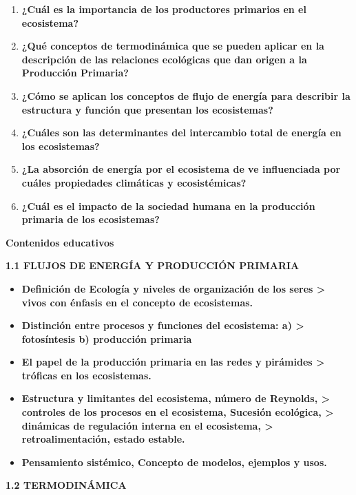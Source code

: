 \documentclass[
]{article}
\begin{document}
\begin{enumerate}
\def\labelenumi{\arabic{enumi}.}
\item
  \textbf{¿Cuál es la importancia de los productores primarios en el
  ecosistema?}
\item
  \textbf{¿Qué conceptos de termodinámica que se pueden aplicar en la
  descripción de las relaciones ecológicas que dan origen a la
  Producción Primaria?}
\item
  \textbf{¿Cómo se aplican los conceptos de flujo de energía para
  describir la estructura y función que presentan los ecosistemas?}
\item
  \textbf{¿Cuáles son las determinantes del intercambio total de energía
  en los ecosistemas?}
\item
  \textbf{¿La absorción de energía por el ecosistema de ve influenciada
  por cuáles propiedades climáticas y ecosistémicas?}
\item
  \textbf{¿Cuál es el impacto de la sociedad humana en la producción
  primaria de los ecosistemas?}
\end{enumerate}

\textbf{Contenidos educativos}

\textbf{1.1 FLUJOS DE ENERGÍA Y PRODUCCIÓN PRIMARIA}

\begin{itemize}
\item
  \textbf{Definición de Ecología y niveles de organización de los seres
  \textgreater{} vivos con énfasis en el concepto de ecosistemas.}
\item
  \textbf{Distinción entre procesos y funciones del ecosistema: a)
  \textgreater{} fotosíntesis b) producción primaria}
\item
  \textbf{El papel de la producción primaria en las redes y pirámides
  \textgreater{} tróficas en los ecosistemas.}
\item
  \textbf{Estructura y limitantes del ecosistema, número de Reynolds,
  \textgreater{} controles de los procesos en el ecosistema, Sucesión
  ecológica, \textgreater{} dinámicas de regulación interna en el
  ecosistema, \textgreater{} retroalimentación, estado estable.}
\item
  \textbf{Pensamiento sistémico, Concepto de modelos, ejemplos y usos.}
\end{itemize}

\textbf{1.2 TERMODINÁMICA}
\end{document}

